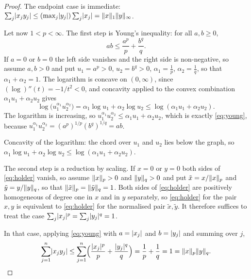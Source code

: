 \begin{proof}
The endpoint case is immediate:
$\sum_j \lvert x_j y_j\rvert \le (\max_j \lvert y_j\rvert) \sum_j \lvert x_j\rvert
= \lVert x\rVert_1 \lVert y\rVert_\infty$.

Let now $1 < p < \infty$. The first step is Young's inequality: for all
$a, b \ge 0$,
\begin{equation}\label{eq:young}
  ab \le \frac{a^p}{p} + \frac{b^q}{q}.
\end{equation}
If $a = 0$ or $b = 0$ the left side vanishes and the right side is
non-negative, so assume $a, b > 0$ and put $u_1 = a^p > 0$, $u_2 = b^q > 0$,
$\alpha_1 = \frac{1}{p}$, $\alpha_2 = \frac{1}{q}$, so that
$\alpha_1 + \alpha_2 = 1$. The logarithm is concave on $(0,\infty)$, since
$(\log)''(t) = -1/t^2 < 0$, and concavity applied to the convex combination
$\alpha_1 u_1 + \alpha_2 u_2$ gives
\[
  \log\bigl(u_1^{\alpha_1} u_2^{\alpha_2}\bigr)
  = \alpha_1 \log u_1 + \alpha_2 \log u_2
  \le \log(\alpha_1 u_1 + \alpha_2 u_2).
\]
The logarithm is increasing, so
$u_1^{\alpha_1} u_2^{\alpha_2} \le \alpha_1 u_1 + \alpha_2 u_2$, which is
exactly \eqref{eq:young}, because
$u_1^{\alpha_1}u_2^{\alpha_2} = (a^p)^{1/p}(b^q)^{1/q} = ab$.

\begin{nfigure}{Concavity of the logarithm: the chord over $u_1$ and $u_2$
lies below the graph, so
$\alpha_1 \log u_1 + \alpha_2 \log u_2 \le \log(\alpha_1 u_1 + \alpha_2 u_2)$.}
\end{nfigure}

The second step is a reduction by scaling. If $x = 0$ or $y = 0$ both sides of
\eqref{eq:holder} vanish, so assume $\lVert x\rVert_p > 0$ and $\lVert y\rVert_q > 0$ and
put $\tilde{x} = x / \lVert x\rVert_p$ and $\tilde{y} = y / \lVert y\rVert_q$, so that
$\lVert\tilde{x}\rVert_p = \lVert\tilde{y}\rVert_q = 1$. Both sides of
\eqref{eq:holder} are positively homogeneous of degree one in $x$ and in $y$
separately, so \eqref{eq:holder} for the pair $x, y$ is equivalent to
\eqref{eq:holder} for the normalised pair $\tilde{x}, \tilde{y}$. It therefore
suffices to treat the case
$\sum_j \lvert x_j\rvert^p = \sum_j \lvert y_j\rvert^q = 1$.

In that case, applying \eqref{eq:young} with $a = \lvert x_j\rvert$ and
$b = \lvert y_j\rvert$ and summing over $j$,
\[
  \sum_{j=1}^{n} \lvert x_j y_j\rvert
  \le \sum_{j=1}^{n} \Bigl(\frac{\lvert x_j\rvert^p}{p}
      + \frac{\lvert y_j\rvert^q}{q}\Bigr)
  = \frac{1}{p} + \frac{1}{q} = 1 = \lVert x\rVert_p \lVert y\rVert_q . \qedhere
\]
\end{proof}

